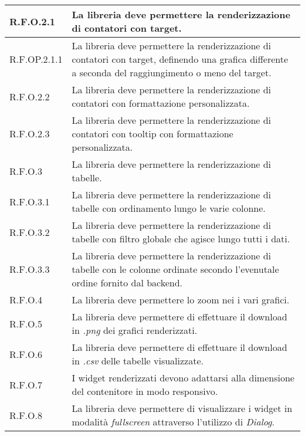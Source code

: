\begin{center}
\begin{longtable}{|p{2.5cm}|p{10cm}|}
        \hline
        R.F.O.2.1          & La libreria deve permettere la renderizzazione di contatori con target.                                      \\
        \hline
        R.F.OP.2.1.1       & La libreria deve permettere la renderizzazione di contatori con target, definendo una grafica
        differente a seconda del raggiungimento o meno del target.                                                                        \\
        \hline
        R.F.O.2.2          & La libreria deve permettere la renderizzazione di contatori con formattazione personalizzata.                \\
        \hline
        R.F.O.2.3          & La libreria deve permettere la renderizzazione di contatori con tooltip con formattazione personalizzata.    \\
        \hline
        R.F.O.3            & La libreria deve permettere la renderizzazione di tabelle.                                                   \\
        \hline
        R.F.O.3.1          & La libreria deve permettere la renderizzazione di tabelle con ordinamento lungo le varie colonne.            \\
        \hline
        R.F.O.3.2          & La libreria deve permettere la renderizzazione di tabelle con filtro globale che agisce lungo tutti i dati.  \\
        \hline
        R.F.O.3.3          & La libreria deve permettere la renderizzazione di tabelle con le colonne ordinate secondo l'evenutale ordine
        fornito dal backend.                                                                                                              \\
        \hline
        R.F.O.4            & La libreria deve permettere lo zoom nei i vari grafici.                                                      \\
        \hline
        R.F.O.5            & La libreria deve permettere di effettuare il download in \textit{.png} dei grafici renderizzati.             \\
        \hline
        R.F.O.6            & La libreria deve permettere di effettuare il download in \textit{.csv} delle tabelle visualizzate.           \\
        \hline
        R.F.O.7            & I widget renderizzati devono adattarsi alla dimensione del contenitore in modo responsivo.                   \\
        \hline
        R.F.O.8            & La libreria deve permettere di visualizzare i widget in modalità \textit{fullscreen} attraverso
        l'utilizzo di \textit{Dialog}.                                                                                                    \\
    \end{longtable}
    \label{tab:requisiti_funzionali}
\end{center}

